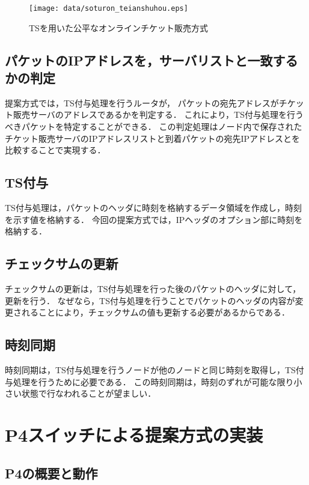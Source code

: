 \documentclass[a4j,11pt]{jreport}
\begin{document}
\begin{figure}[htbp]
  \centering
  \texttt{[image: data/soturon\_teianshuhou.eps]}
  \vspace{0mm}
  \caption{TSを用いた公平なオンラインチケット販売方式}
  \label{fig:teianshuhou}
\end{figure}

\section{パケットのIPアドレスを，サーバリストと一致するかの判定}
提案方式では，TS付与処理を行うルータが，
パケットの宛先アドレスがチケット販売サーバのアドレスであるかを判定する．
これにより，TS付与処理を行うべきパケットを特定することができる．
この判定処理はノード内で保存されたチケット販売サーバのIPアドレスリストと到着パケットの宛先IPアドレスとを比較することで実現する．

\section{TS付与}
TS付与処理は，パケットのヘッダに時刻を格納するデータ領域を作成し，時刻を示す値を格納する．
今回の提案方式では，IPヘッダのオプション部に時刻を格納する．

\section{チェックサムの更新}
チェックサムの更新は，TS付与処理を行った後のパケットのヘッダに対して，更新を行う．
なぜなら，TS付与処理を行うことでパケットのヘッダの内容が変更されることにより，チェックサムの値も更新する必要があるからである．


\section{時刻同期}
時刻同期は，TS付与処理を行うノードが他のノードと同じ時刻を取得し，TS付与処理を行うために必要である．
この時刻同期は，時刻のずれが可能な限り小さい状態で行なわれることが望ましい．



\chapter{P4スイッチによる提案方式の実装}

\section{P4の概要と動作}
\end{document}
